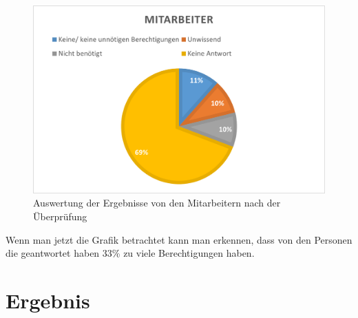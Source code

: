 \begin{figure}[h!]
 \centering
 \includegraphics[width=1\textwidth]{gfx/Picture/Mitarbeiter(korregiert).PNG}
 \caption{Auswertung der Ergebnisse von den Mitarbeitern nach der Überprüfung}
 \label{fig:MitPruf}
\end{figure}
Wenn man jetzt die Grafik betrachtet kann man erkennen, dass von den Personen die geantwortet haben 33\% zu viele Berechtigungen haben.

\section{Ergebnis}
\label{sec:Ergebnis}

